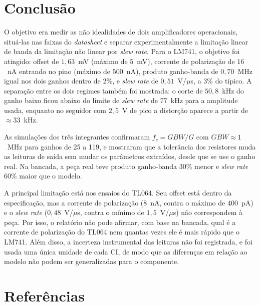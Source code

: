 \documentclass[11pt,a4paper]{article}
\begin{document}
\section{Conclusão}

O objetivo era medir as não idealidades de dois amplificadores operacionais, situá-las nas faixas
do \textit{datasheet} e separar experimentalmente a limitação linear de banda da limitação não
linear por \textit{slew rate}. Para o LM741, o objetivo foi atingido: offset de $1{,}63$~mV
(máximo de $5$~mV), corrente de polarização de $16$~nA entrando no pino (máximo de $500$~nA),
produto ganho-banda de $0{,}70$~MHz igual nos dois ganhos dentro de $2\%$, e \textit{slew rate}
de $0{,}51$~V/$\mu$s, a $3\%$ do típico. A separação entre os dois regimes também foi mostrada: o
corte de $50{,}8$~kHz do ganho baixo ficou abaixo do limite de \textit{slew rate} de $77$~kHz para
a amplitude usada, enquanto no seguidor com $2{,}5$~V de pico a distorção aparece a partir de
$\approx33$~kHz.

As simulações dos três integrantes confirmaram $f_c=GBW/G$ com $GBW\approx1$~MHz para ganhos de
25 a 119, e mostraram que a tolerância dos resistores muda as leituras de saída sem mudar os
parâmetros extraídos, desde que se use o ganho real. Na bancada, a peça real teve produto
ganho-banda $30\%$ menor e \textit{slew rate} $60\%$ maior que o modelo.

A principal limitação está nos ensaios do TL064. Seu offset está dentro da especificação, mas a
corrente de polarização ($8$~nA, contra o máximo de $400$~pA) e o \textit{slew rate}
($0{,}48$~V/$\mu$s, contra o mínimo de $1{,}5$~V/$\mu$s) não correspondem à peça. Por isso, o
relatório não pode afirmar, com base na bancada, qual é a corrente de polarização do TL064 nem
quantas vezes ele é mais rápido que o LM741. Além disso, a incerteza instrumental das leituras não
foi registrada, e foi usada uma única unidade de cada CI, de modo que as diferenças em relação ao
modelo não podem ser generalizadas para o componente.

\section{Referências}
\end{document}
